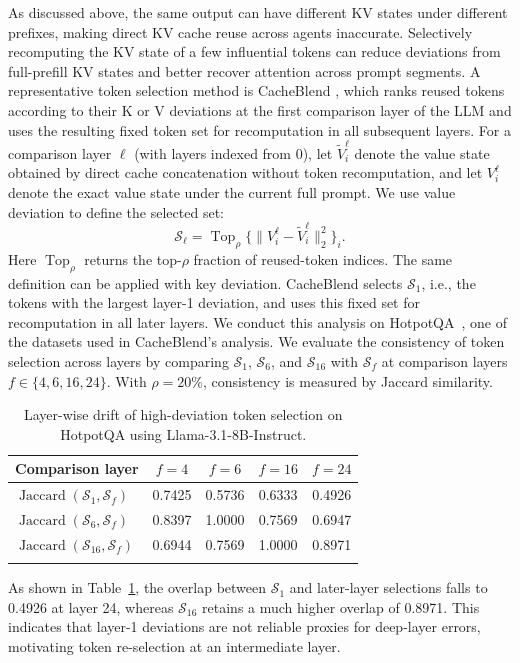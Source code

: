 \documentclass[letterpaper]{article} %
\begin{document}
As discussed above, the same output can have different KV states under different prefixes, making direct KV cache reuse across agents inaccurate. Selectively recomputing the KV state of a few influential tokens can reduce deviations from full-prefill KV states and better recover attention across prompt segments. A representative token selection method is CacheBlend \citep{DBLP:conf/eurosys/YaoLLRCZD0J25}, which ranks reused tokens according to their K or V deviations at the first comparison layer of the LLM and uses the resulting fixed token set for recomputation in all subsequent layers. For a comparison layer $\ell$ (with layers indexed from 0), let $\tilde V_i^\ell$ denote the value state obtained by direct cache concatenation without token recomputation, and let $V_i^\ell$ denote the exact value state under the current full prompt. We use value deviation to define the selected set:
\begin{equation}
\mathcal S_\ell =
\operatorname{Top}_{\rho}
\{\|V_i^\ell-\tilde V_i^\ell\|_2^2\}_i .
\end{equation}
Here $\operatorname{Top}_{\rho}$ returns the top-$\rho$ fraction of reused-token indices. The same definition can be applied with key deviation. CacheBlend selects $\mathcal S_1$, i.e., the tokens with the largest layer-1 deviation, and uses this fixed set for recomputation in all later layers. We conduct this analysis on HotpotQA~\citep{DBLP:conf/emnlp/Yang0ZBCSM18}, one of the datasets used in CacheBlend's analysis. We evaluate the consistency of token selection across layers by comparing $\mathcal S_1$, $\mathcal S_6$, and $\mathcal S_{16}$ with $\mathcal S_f$ at comparison layers $f\in\{4,6,16,24\}$. With $\rho=20\%$, consistency is measured by Jaccard similarity. 
\begin{table}[t]
\centering
\setlength{\tabcolsep}{4.7pt}
\begin{tabular}{lcccc}
\hline
\addlinespace[1pt]
Comparison layer & $f=4$ & $f=6$ & $f=16$ & $f=24$ \\
\hline
\addlinespace[1pt]
$\operatorname{Jaccard}(\mathcal S_1,\mathcal S_f)$ & 0.7425 & 0.5736 & 0.6333 & 0.4926 \\
$\operatorname{Jaccard}(\mathcal S_6,\mathcal S_f)$ & 0.8397 & 1.0000 & 0.7569 & 0.6947 \\
$\operatorname{Jaccard}(\mathcal S_{16},\mathcal S_f)$ & 0.6944 & 0.7569 & 1.0000 & 0.8971 \\
\addlinespace[1pt]
\hline
\end{tabular}
\caption{Layer-wise drift of high-deviation token selection on HotpotQA using Llama-3.1-8B-Instruct.}
\label{tab:layer-drift}
\end{table}
As shown in Table~\ref{tab:layer-drift}, the overlap between $\mathcal S_1$ and later-layer selections falls to 0.4926 at layer 24, whereas $\mathcal S_{16}$ retains a much higher overlap of 0.8971. 
This indicates that layer-1 deviations are not reliable proxies for deep-layer errors, motivating token re-selection at an intermediate layer.
\end{document}
